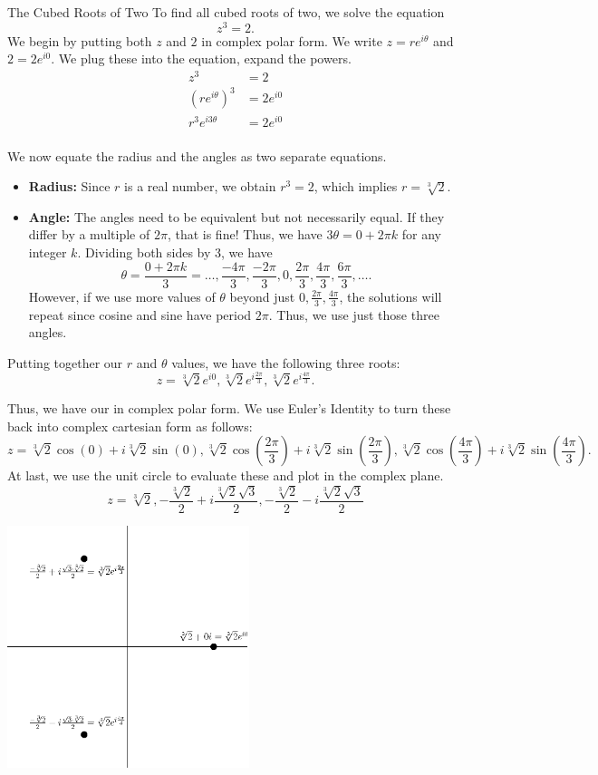 \begin{example}{The Cubed Roots of Two} To find all cubed roots of two, we solve the equation $$z^3=2. $$
We begin by putting both $z$ and $2$ in complex polar form.  We write $z=re^{i\theta}$ and $2=2e^{i0}$.  We plug these into the equation, expand the powers. \begin{align*}
z^3&=2 \\
\left(re^{i\theta}\right)^3&=2e^{i0} \\
r^3e^{i3\theta}&=2e^{i0} \\
\end{align*}
 
 We now equate the radius and the angles as two separate equations.
 
 \begin{itemize}
 \item {\bf Radius:} Since $r$ is a real number, we obtain $r^3=2$, which implies $r=\sqrt[3]{2}$.
 \item {\bf Angle:} The angles need to be equivalent but not necessarily equal.  If they differ by a multiple of $2\pi$, that is fine!  Thus, we have $3\theta = 0 + 2\pi k$ for any integer $k$.  Dividing both sides by 3, we have $$\theta=\frac{0 + 2\pi k}{3} =\ldots,\frac{-4\pi}{3},\frac{-2\pi}{3},0,\frac{2\pi}{3},\frac{4\pi}{3},\frac{6\pi}{3},\ldots. $$
However, if we use more values of $\theta$ beyond just $0,\frac{2\pi}{3},\frac{4\pi}{3}$, the solutions will repeat since cosine and sine have period $2\pi$. Thus, we use just those three angles.
 \end{itemize}
 Putting together our $r$ and $\theta$ values, we have the following three roots: $$z=\sqrt[3]{2}e^{i0},\sqrt[3]{2}e^{i\frac{2\pi}{3}},\sqrt[3]{2}e^{i\frac{4\pi}{3}} .$$

Thus, we have our  in complex polar form.  We use Euler's Identity to turn these back into complex cartesian form as follows:
$$z=\sqrt[3]{2}\cos(0)+i\sqrt[3]{2}\sin(0),\sqrt[3]{2}\cos(\frac{2\pi}{3})+i\sqrt[3]{2}\sin(\frac{2\pi}{3}),\sqrt[3]{2}\cos(\frac{4\pi}{3})+i\sqrt[3]{2}\sin(\frac{4\pi}{3}).$$
At last, we use the unit circle to evaluate these and plot in the complex plane. 
$$z=\sqrt[3]{2},-\frac{\sqrt[3]{2}}{2}+i\frac{\sqrt[3]{2}\sqrt{3}}{2},-\frac{\sqrt[3]{2}}{2}-i\frac{\sqrt[3]{2}\sqrt{3}}{2}$$

\begin{center}
\includegraphics[width=200pt]{ChapterComplex/Figures/cuberoot2.eps}
\end{center}

\end{example}

